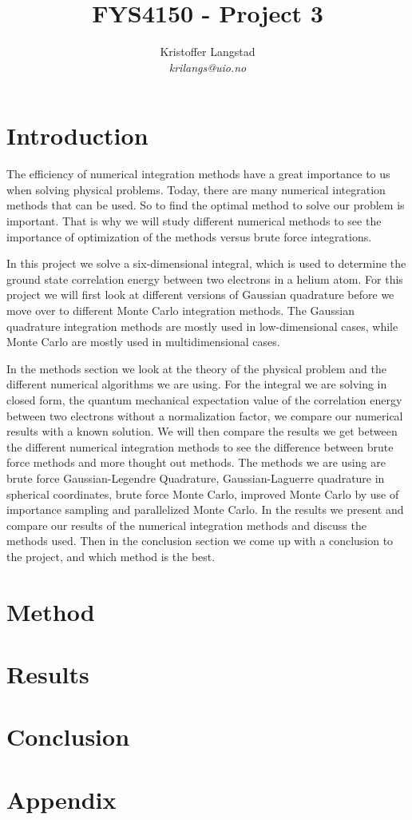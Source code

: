 \documentclass[12pt,a4paper,english]{article}
\title{FYS4150 - Project 3}
\date{}
\author{ Kristoffer Langstad\\ \textit{krilangs@uio.no}}
\begin{document}
\maketitle
\begin{abstract}
	
\end{abstract}

\section{Introduction}
The efficiency of numerical integration methods have a great importance to us when solving physical problems. Today, there are many numerical integration methods that can be used. So to find the optimal method to solve our problem is important. That is why we will study different numerical methods to see the importance of optimization of the methods versus brute force integrations.

In this project we solve a six-dimensional integral, which is used to determine the ground state correlation energy between two electrons in a helium atom. For this project we will first look at different versions of Gaussian quadrature before we move over to different Monte Carlo integration methods. The Gaussian quadrature integration methods are mostly used in low-dimensional cases, while Monte Carlo are mostly used in multidimensional cases.

In the methods section we look at the theory of the physical problem and the different numerical algorithms we are using. For the integral we are solving in closed form, the quantum mechanical expectation value of the correlation energy between two electrons without a normalization factor, we compare our numerical results with a known solution. We will then compare the results we get between the different numerical integration methods to see the difference between brute force methods and more thought out methods. The methods we are using are brute force Gaussian-Legendre Quadrature, Gaussian-Laguerre quadrature in spherical coordinates, brute force Monte Carlo, improved Monte Carlo by use of importance sampling and parallelized Monte Carlo. In the results we present and compare our results of the numerical integration methods and discuss the methods used. Then in the conclusion section we come up with a conclusion to the project, and which method is the best.

\section{Method}
\section{Results}
\section{Conclusion}
\appendix
\section{Appendix}
\label{sect:appendix}
\end{document}
